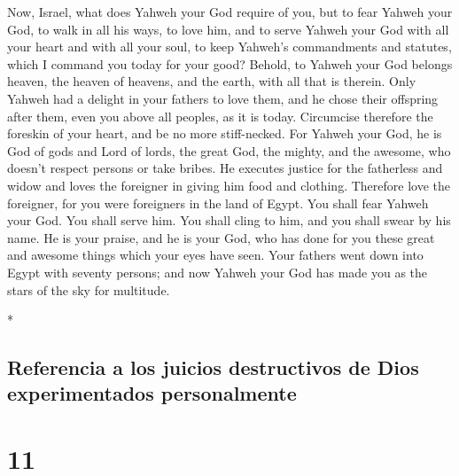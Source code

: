 \begin{paracol}{2}
\begin{otherlanguage}{english}
 Now, Israel, what does Yahweh your God require of you,
but to fear Yahweh your God, to walk in all his ways, to love him, and
to serve Yahweh your God with all your heart and with all your soul,
 to keep Yahweh's commandments and statutes, which I
command you today for your good?  Behold, to Yahweh your
God belongs heaven, the heaven of heavens, and the earth, with all that
is therein.  Only Yahweh had a delight in your fathers to
love them, and he chose their offspring after them, even you above all
peoples, as it is today.  Circumcise therefore the
foreskin of your heart, and be no more stiff-necked.  For
Yahweh your God, he is God of gods and Lord of lords, the great God, the
mighty, and the awesome, who doesn't respect persons or take bribes.
 He executes justice for the fatherless and widow and
loves the foreigner in giving him food and clothing. 
Therefore love the foreigner, for you were foreigners in the land of
Egypt.  You shall fear Yahweh your God. You shall serve
him. You shall cling to him, and you shall swear by his name.
 He is your praise, and he is your God, who has done for
you these great and awesome things which your eyes have seen.
 Your fathers went down into Egypt with seventy persons;
and now Yahweh your God has made you as the stars of the sky for
multitude.

\end{otherlanguage}

\switchcolumn[0]*

\hypertarget{referencia-a-los-juicios-destructivos-de-dios-experimentados-personalmente}{%
\subsection{Referencia a los juicios destructivos de Dios experimentados
personalmente}\label{referencia-a-los-juicios-destructivos-de-dios-experimentados-personalmente}}

\hypertarget{section-20}{%
\section{11}\label{section-20}}


\end{paracol}

